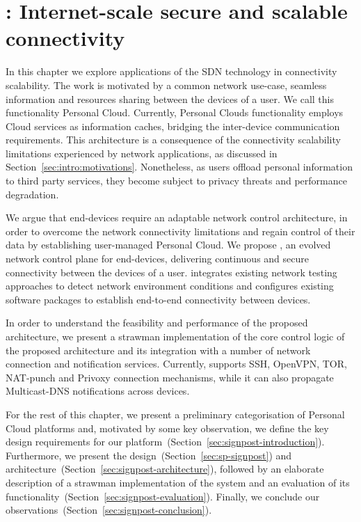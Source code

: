 \chapter{\signpost: Internet-scale secure and scalable connectivity}
\label{sec:signpost}
\ifpdf
    \graphicspath{{Chapter3/Chapter3Figs/PNG/}{Chapter3/Chapter3Figs/PDF/}{Chapter3/Chapter3Figs/}}
\else
    \graphicspath{{Chapter3/Chapter3Figs/EPS/}{Chapter3/Chapter3Figs/}}
\fi

In this chapter we explore applications of the SDN technology in connectivity
scalability.  The work is motivated by a common network use-case, seamless
information and resources sharing between the devices of a user.  We call this
functionality Personal Cloud.  Currently, Personal Clouds functionality employs
Cloud services as information caches, bridging the inter-device
communication requirements. This architecture is a consequence of the connectivity
scalability limitations experienced by network applications, as discussed in
Section~\ref{sec:intro:motivations}. Nonetheless, as users offload personal
information to third party services, they become subject to privacy threats and
performance degradation.

We argue that end-devices require an adaptable network control architecture, in
order to overcome the network connectivity limitations and regain control of
their data by establishing user-managed Personal Cloud.  We propose \signpost,
an evolved network control plane for end-devices, delivering continuous and
secure connectivity between the devices of a user. \signpost integrates existing
network testing approaches to detect network environment conditions and
configures existing software packages to establish end-to-end connectivity
between devices. 

In order to understand the feasibility and performance of the proposed
architecture, we present a strawman implementation of the core control logic of
the proposed architecture and its integration with a number of network
connection and notification services.  Currently, \signpost supports SSH,
OpenVPN, TOR, NAT-punch and Privoxy connection mechanisms, while it can also
propagate Multicast-DNS notifications across devices.

For the rest of this chapter, we present a preliminary categorisation of
Personal Cloud platforms and,
motivated by some key observation, we define the key design requirements for our
platform~(Section~\ref{sec:signpost-introduction}). Furthermore, we present the
\signpost design~(Section~\ref{sec:sp-signpost}) and  
architecture~(Section~\ref{sec:signpost-architecture}), followed by an elaborate
description of a strawman implementation of the system and an evaluation of its
functionality~(Section~\ref{sec:signpost-evaluation}).  Finally, we conclude our
observations~(Section~\ref{sec:signpost-conclusion}).

